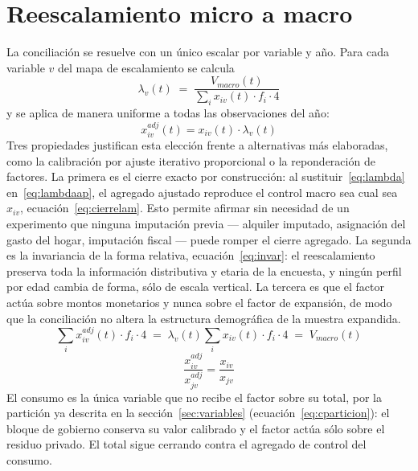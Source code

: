 \documentclass[11pt,a4paper]{article}
\begin{document}
\section{Reescalamiento micro a macro}
\label{sec:reescalamiento}
La conciliación se resuelve con un único escalar por variable y año. Para cada variable $v$ del
mapa de escalamiento se calcula
\begin{equation}
\label{eq:lambda}
\lambda_v(t) \;=\; \frac{V_{macro}(t)}{\displaystyle\sum_i x_{iv}(t)\cdot f_i \cdot 4}
\end{equation}
y se aplica de manera uniforme a todas las observaciones del año:
\begin{equation}
\label{eq:lambdaap}
x^{adj}_{iv}(t) = x_{iv}(t)\cdot \lambda_v(t)
\end{equation}
Tres propiedades justifican esta elección frente a alternativas más elaboradas, como la
calibración por ajuste iterativo proporcional o la reponderación de factores. La primera es el
cierre exacto por construcción: al sustituir~\eqref{eq:lambda} en~\eqref{eq:lambdaap}, el
agregado ajustado reproduce el control macro sea cual sea $x_{iv}$, ecuación~\eqref{eq:cierrelam}.
Esto permite afirmar sin necesidad de un experimento que ninguna imputación previa --- alquiler
imputado, asignación del gasto del hogar, imputación fiscal --- puede romper el cierre agregado.
La segunda es la invariancia de la forma relativa, ecuación~\eqref{eq:invar}: el reescalamiento
preserva toda la información distributiva y etaria de la encuesta, y ningún perfil por edad
cambia de forma, sólo de escala vertical. La tercera es que el factor actúa sobre montos
monetarios y nunca sobre el factor de expansión, de modo que la conciliación no altera la
estructura demográfica de la muestra expandida.
\begin{equation}
\label{eq:cierrelam}
\sum_i x^{adj}_{iv}(t)\cdot f_i\cdot 4 \;=\;
\lambda_v(t)\sum_i x_{iv}(t)\cdot f_i\cdot 4 \;=\; V_{macro}(t)
\end{equation}
\begin{equation}
\label{eq:invar}
\frac{x^{adj}_{iv}}{x^{adj}_{jv}} = \frac{x_{iv}}{x_{jv}}
\end{equation}
El consumo es la única variable que no recibe el factor sobre su total, por la partición ya
descrita en la sección~\ref{sec:variables} (ecuación~\eqref{eq:cparticion}): el bloque de
gobierno conserva su valor calibrado y el factor actúa sólo sobre el residuo privado. El total
sigue cerrando contra el agregado de control del consumo.
\end{document}
